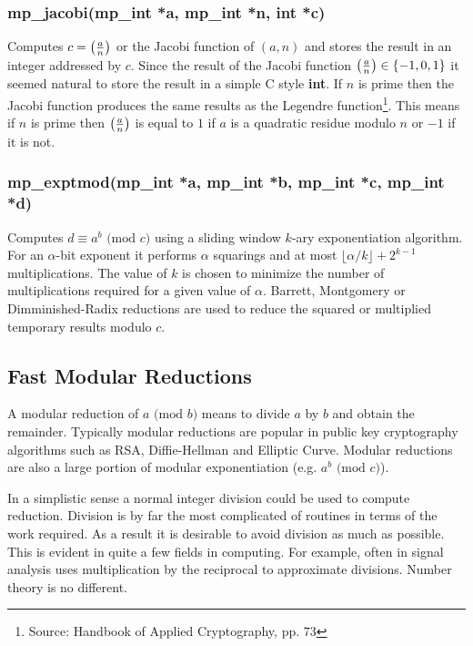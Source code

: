 \documentclass{article}
\begin{document}
\subsubsection{mp\_jacobi(mp\_int *a, mp\_int *n, int *c)}
Computes $c = \left ( {a \over n} \right )$ or the Jacobi function of $(a, n)$ and stores the result in an integer addressed
by $c$.  Since the result of the Jacobi function $\left ( {a \over n} \right ) \in \lbrace -1, 0, 1 \rbrace$ it seemed
natural to store the result in a simple C style \textbf{int}.  If $n$ is prime then the Jacobi function produces
the same results as the Legendre function\footnote{Source: Handbook of Applied Cryptography, pp. 73}.  This means if
$n$ is prime then $\left ( {a \over n} \right )$ is equal to $1$ if $a$ is a quadratic residue modulo $n$ or $-1$ if 
it is not.

\subsubsection{mp\_exptmod(mp\_int *a, mp\_int *b, mp\_int *c, mp\_int *d)}
Computes $d \equiv a^b \mbox{ (mod }c\mbox{)}$ using a sliding window $k$-ary exponentiation algorithm.  For an $\alpha$-bit
exponent it performs $\alpha$ squarings and at most $\lfloor \alpha/k \rfloor + 2^{k-1}$ multiplications.  The value of $k$ is
chosen to minimize the number of multiplications required for a given value of $\alpha$.  Barrett, Montgomery or
Dimminished-Radix reductions are used to reduce the squared or multiplied temporary results modulo $c$.

\subsection{Fast Modular Reductions}

A modular reduction of $a \mbox{ (mod }b\mbox{)}$ means to divide $a$ by $b$ and obtain the remainder.  
Typically modular reductions are popular in public key cryptography algorithms such as RSA, 
Diffie-Hellman and Elliptic Curve.  Modular reductions are also a large portion of modular exponentiation 
(e.g. $a^b \mbox{ (mod }c\mbox{)}$).  

In a simplistic sense a normal integer division could be used to compute reduction.  Division is by far
the most complicated of routines in terms of the work required.  As a result it is desirable to avoid
division as much as possible.  This is evident in quite a few fields in computing.  For example, often in
signal analysis uses multiplication by the reciprocal to approximate divisions.  Number theory is no
different.
\end{document}
